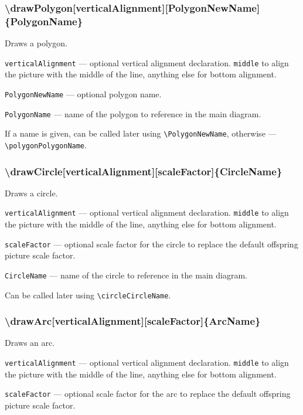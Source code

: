 \documentclass{ltxdoc}
\begin{document}
\subsubsection{\textbackslash drawPolygon[verticalAlignment][PolygonNewName]\{PolygonName\}}

	Draws a polygon.

	\texttt{verticalAlignment} — optional vertical alignment declaration. \texttt{middle} to align the picture with the middle of the line, anything else for bottom alignment.

	\texttt{PolygonNewName} — optional polygon name. 
	
	\texttt{PolygonName} — name of the polygon to reference in the main diagram. 
	
	If a name is given, can be called later using \texttt{\textbackslash PolygonNewName}, otherwise — \texttt{\textbackslash polygonPolygonName}. 
	
\subsubsection{\textbackslash drawCircle[verticalAlignment][scaleFactor]\{CircleName\}}

	Draws a circle.

	\texttt{verticalAlignment} — optional vertical alignment declaration. \texttt{middle} to align the picture with the middle of the line, anything else for bottom alignment.
	
	\texttt{scaleFactor} — optional scale factor for the circle to replace the default offspring picture scale factor. 
	
	\texttt{CircleName} — name of the circle to reference in the main diagram. 
	
	Can be called later using \texttt{\textbackslash circleCircleName}.
	
\subsubsection{\textbackslash drawArc[verticalAlignment][scaleFactor]\{ArcName\}}

	Draws an arc.

	\texttt{verticalAlignment} — optional vertical alignment declaration. \texttt{middle} to align the picture with the middle of the line, anything else for bottom alignment.
	
	\texttt{scaleFactor} — optional scale factor for the arc to replace the default offspring picture scale factor. 
	
\end{document}
